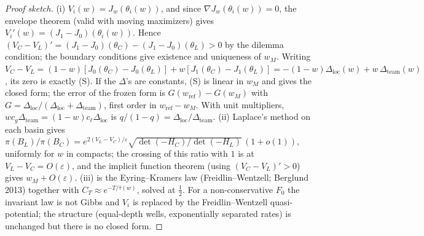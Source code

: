 \documentclass[11pt]{article}
\theoremstyle{definition}
\theoremstyle{remark}
\begin{document}
\begin{proof}[Proof sketch]
(i) $V_i(w)=J_w(\theta_i(w))$, and since $\nabla J_w(\theta_i(w))=0$, the envelope theorem (valid with moving maximizers) gives $V_i'(w)=(J_1-J_0)(\theta_i(w))$. Hence $(V_C-V_L)'=(J_1-J_0)(\theta_C)-(J_1-J_0)(\theta_L)>0$ by the dilemma condition; the boundary conditions give existence and uniqueness of $w_M$. Writing $V_C-V_L=(1-w)[J_0(\theta_C)-J_0(\theta_L)]+w[J_1(\theta_C)-J_1(\theta_L)]=-(1-w)\Delta_{\mathrm{loc}}(w)+w\,\Delta_{\mathrm{team}}(w)$, its zero is exactly (S). If the $\Delta$'s are constants, (S) is linear in $w_M$ and gives the closed form; the error of the frozen form is $G(w_{\mathrm{ref}})-G(w_M)$ with $G=\Delta_{\mathrm{loc}}/(\Delta_{\mathrm{loc}}+\Delta_{\mathrm{team}})$, first order in $w_{\mathrm{ref}}-w_M$. With unit multipliers, $w c_g\Delta_{\mathrm{team}}=(1-w)c_\ell\Delta_{\mathrm{loc}}$ is $q/(1-q)=\Delta_{\mathrm{loc}}/\Delta_{\mathrm{team}}$.
(ii) Laplace's method on each basin gives $\pi(B_L)/\pi(B_C)=e^{2(V_L-V_C)/\varepsilon}\sqrt{\det(-H_C)/\det(-H_L)}\,(1+o(1))$, uniformly for $w$ in compacts; the crossing of this ratio with $1$ is at $V_L-V_C=O(\varepsilon)$, and the implicit function theorem (using $(V_C-V_L)'>0$) gives $w_M+O(\varepsilon)$.
(iii) is the Eyring--Kramers law (Freidlin--Wentzell; Berglund 2013) together with $C_T\approx e^{-T/\bar\tau(w)}$, solved at $\tfrac12$. For a non-conservative $F_0$ the invariant law is not Gibbs and $V_i$ is replaced by the Freidlin--Wentzell quasi-potential; the structure (equal-depth wells, exponentially separated rates) is unchanged but there is no closed form.
\end{proof}
\end{document}
